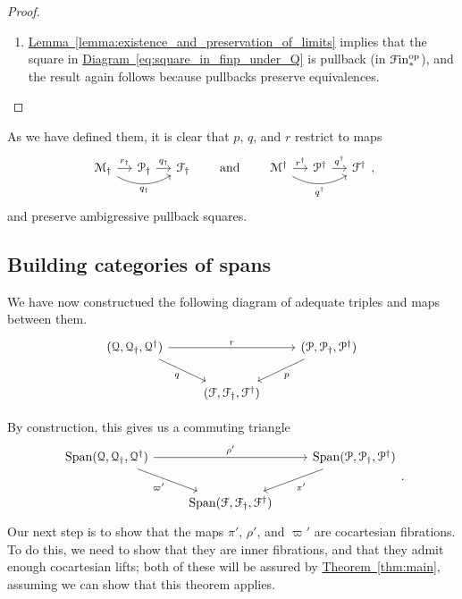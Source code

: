 \documentclass[main.tex]{subfiles}
\begin{document}
\begin{proof}
\begin{enumerate}
\begin{enumerate}
        \item \hyperref[lemma:existence_and_preservation_of_limits]{Lemma~\ref*{lemma:existence_and_preservation_of_limits}} implies that the square in \hyperref[eq:square_in_finp_under_Q]{Diagram~\ref*{eq:square_in_finp_under_Q}} is pullback (in $\mathcal{F}\mathrm{in}_{*}^{\mathrm{op}}$), and the result again follows because pullbacks preserve equivalences.
      \end{enumerate}
  \end{enumerate}
\end{proof}

As we have defined them, it is clear that $p$, $q$, and $r$ restrict to maps
\begin{equation*}
  \begin{tikzcd}[column sep=small]
    \mathcal{M}_{\dagger}
    \arrow[r, "r_{\dagger}"]
    \arrow[rr, swap,  bend right, "q_{\dagger}"]
    & \mathcal{P}_{\dagger}
    \arrow[r, "q_{\dagger}"]
    & \mathcal{F}_{\dagger}
  \end{tikzcd}
  \qquad\text{and}\qquad
  \begin{tikzcd}[column sep=small]
    \mathcal{M}^{\dagger}
    \arrow[r, "r^{\dagger}"]
    \arrow[rr, swap,  bend right, "q^{\dagger}"]
    & \mathcal{P}^{\dagger}
    \arrow[r, "q^{\dagger}"]
    & \mathcal{F}^{\dagger}
  \end{tikzcd},
\end{equation*}
and preserve ambigressive pullback squares.


\subsection{Building categories of spans}
\label{ssc:building_categories_of_spans}

We have now constructued the following diagram of adequate triples and maps between them.
\begin{equation*}
  \begin{tikzcd}
    \triple{Q}
    \arrow[rr, "r"]
    \arrow[dr, swap, "q"]
    && \triple{P}
    \arrow[dl, "p"]
    \\
    & \triple{F}
  \end{tikzcd}
\end{equation*}

By construction, this gives us a commuting triangle
\begin{equation}
  \label{eq:commuting_diagram_of_spans}
  \begin{tikzcd}
    \Span\triple{Q}
    \arrow[rr, "\rho'"]
    \arrow[dr, swap, "\varpi'"]
    && \Span\triple{P}
    \arrow[dl, "\pi'"]
    \\
    & \Span\triple{F}
  \end{tikzcd}.
\end{equation}
Our next step is to show that the maps $\pi'$, $\rho'$, and $\varpi'$ are cocartesian fibrations. To do this, we need to show that they are inner fibrations, and that they admit enough cocartesian lifts; both of these will be assured by \hyperref[thm:main]{Theorem~\ref*{thm:main}}, assuming we can show that this theorem applies.
\end{document}
